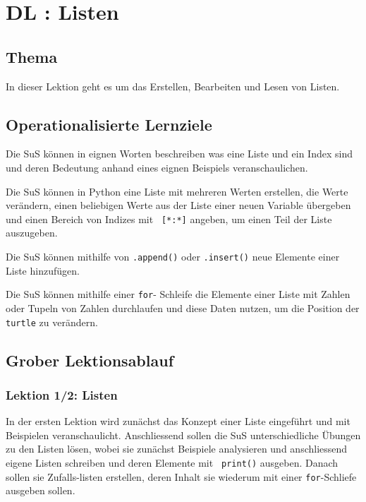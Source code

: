 \section{DL \themycounter: Listen}
\begin{myExBox}[title=DL \themycounter]
\subsection*{Thema}
In dieser Lektion geht es um das Erstellen, Bearbeiten und Lesen von Listen.

\subsection*{Operationalisierte Lernziele}
\begin{todolist}
    \item Die SuS können in eignen Worten beschreiben was eine Liste und ein Index sind und deren Bedeutung anhand eines eignen Beispiels veranschaulichen.
    \item Die SuS können in Python eine Liste mit mehreren Werten erstellen, die Werte verändern, einen beliebigen Werte aus der Liste einer neuen Variable übergeben und einen Bereich von Indizes mit \lstinline| [*:*]| angeben, um einen Teil der Liste auszugeben.
    \item Die SuS können mithilfe von \lstinline|.append()| oder \lstinline|.insert()| neue Elemente einer Liste hinzufügen.
    \item Die SuS können mithilfe einer \lstinline|for|-  Schleife die Elemente einer Liste mit Zahlen oder Tupeln von Zahlen durchlaufen und diese Daten nutzen, um die Position der \lstinline|turtle| zu verändern.
\end{todolist}

\subsection*{Grober Lektionsablauf}
\subsubsection*{Lektion 1/2: Listen}
In der ersten Lektion wird zunächst das Konzept einer Liste eingeführt und mit Beispielen veranschaulicht. Anschliessend sollen die SuS unterschiedliche Übungen zu den Listen lösen, wobei sie zunächst Beispiele analysieren und anschliessend eigene Listen schreiben und deren Elemente mit \lstinline| print()| ausgeben. Danach sollen sie Zufalls-listen erstellen, deren Inhalt sie wiederum mit einer \lstinline|for|-Schliefe ausgeben sollen.


\end{myExBox}
